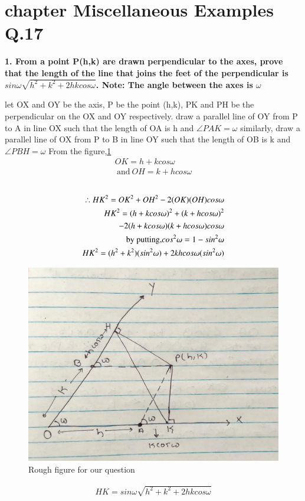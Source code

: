 \documentclass[journal,12pt,twocolumn]{IEEEtran}
\begin{document}
\renewcommand{\thefigure}{\theenumi}
\renewcommand{\thetable}{\theenumi}




\section{ chapter  Miscellaneous Examples  Q.17 }


\textbf{1. From a point P(h,k) are drawn perpendicular to the axes, prove that the length of the line that joins the feet of the perpendicular is $ sin\omega \sqrt{h^2+k^2+2hkcos\omega }$.
\newline Note: The angle between the axes is $\omega $}

\solution

let
OX and OY be the axis, P be the point (h,k), PK and PH be the perpendicular on the OX and OY respectively.
\newline draw a parallel line of OY from P to A in line OX such that the length of OA is h and $\angle PAK =  \omega $
\newline similarly, draw a parallel line of OX from P to B in line OY such that the length of OB is k and $\angle PBH = \omega $
\newline From the figure,\ref{fig:assignment02}
\begin{align}
    OK = h + k cos\omega \\ ~\text{and}~
    OH = k + h cos\omega 
\end{align}
\begin{align}
 \\ \therefore
HK^2 = OK^2 + OH^2 -2(OK)(OH) cos\omega\\
HK^2 = ( h + k cos\omega)^2 + ( k + h cos\omega)^2 \\ 
 -2(h + k cos\omega )( k + h cos\omega) cos\omega \nonumber \\
 \newline\text{by putting,} cos^2\omega = 1 - sin^2\omega \nonumber
\\HK^2 = (h^2 + k^2)(sin^2\omega) + 2khcos\omega(sin^2\omega)
\end{align}
\begin{figure}[!ht]
	\centering
	\includegraphics[width=\columnwidth]{assignment2.jpeg}
	\caption{Rough figure for our question}
	\label{fig:assignment02}
\end{figure}

\begin{align}
  HK =  sin\omega \sqrt{h^2+k^2+2hkcos\omega }
\end{align}


    
    
\end{document}
